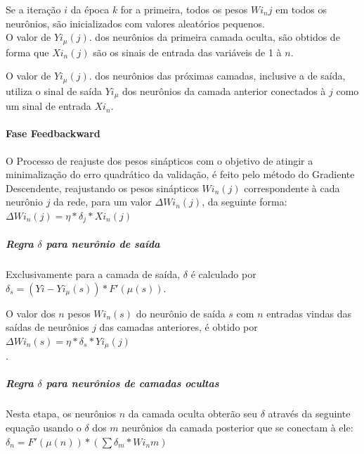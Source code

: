            Se a iteração $i$ da época $k$ for a primeira, todos os pesos $Wi_{n}j$ em todos os neurônios, são inicializados com valores aleatórios pequenos.\\ 
            
            O valor de $Yi_{\mu}(j)$. dos neurônios da primeira camada oculta, são obtidos de forma que $Xi_{n}(j)$ são os sinais de entrada das variáveis de 1 à $n$.
            
            O valor de $Yi_{\mu}(j)$. dos neurônios das próximas camadas, inclusive a de saída, utiliza o sinal de saída $Yi_{\mu}$ dos neurônios da camada anterior conectados à $j$ como um sinal de entrada $Xi_{n}$.
            
            \paragraph*{Fase Feedbackward}
            O Processo de reajuste dos pesos sinápticos com o objetivo de atingir a minimalização do erro quadrático da validação, é feito pelo método do Gradiente Descendente, reajustando os pesos sinápticos $Wi_{n}(j)$ correspondente à cada neurônio $j$ da rede, para um valor $\Delta Wi_{n}(j)$, da seguinte forma:\\
            $\Delta Wi_{n}(j) = \eta*\delta_j*Xi_{n}(j)$\\
            
            \subparagraph*{Regra $\delta$ para neurônio de saída}
            Exclusivamente para a camada de saída, $\delta$ é calculado por\\
            $\delta_s = (Yi - Yi_{\mu}(s) )*F'(\mu(s))$.
            
            O valor dos $n$ pesos $Wi_{n}(s)$ do neurônio de saída $s$ com $n$ entradas vindas das saídas de neurônios $j$ das camadas anteriores, é obtido por $\Delta Wi_{n}(s) = \eta*\delta_s*Yi_{\mu}(j)$\\.

           \subparagraph*{Regra $\delta$ para neurônios de camadas ocultas}
            Nesta etapa, os neurônios $n$ da camada oculta obterão seu $\delta$ através da seguinte equação usando o $\delta$ dos $m$ neurônios da camada posterior que se conectam à ele:\\ 
            
            $\delta_n = F'(\mu(n))*(\sum \delta_m*Wi_{n}m)$\\
            
